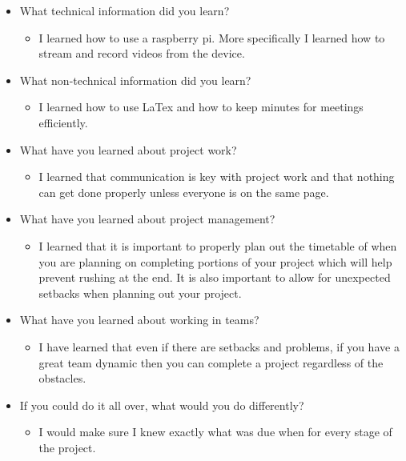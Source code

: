 \documentclass[onecolumn, draftclsnofoot,10pt, compsoc]{IEEEtran}
\begin{document}
    \begin{itemize}
        \item What technical information did you learn?
        \begin{itemize}
            \item I learned how to use a raspberry pi. 
            More specifically I learned how to stream and record videos from the device.
        \end{itemize}
        \item What non-technical information did you learn?
        \begin{itemize}
            \item I learned how to use LaTex and how to keep minutes for meetings efficiently.
        \end{itemize}
        \item What have you learned about project work?
        \begin{itemize}
            \item I learned that communication is key with project work and that nothing can get done properly unless everyone is on the same page.
        \end{itemize}
        \item What have you learned about project management?
        \begin{itemize}
            \item I learned that it is important to properly plan out the timetable of when you are planning on completing portions of your project which will help prevent rushing at the end. 
            It is also important to allow for unexpected setbacks when planning out your project.
        \end{itemize}
        \item What have you learned about working in teams?
        \begin{itemize}
            \item I have learned that even if there are setbacks and problems, if you have a great team dynamic then you can complete a project regardless of the obstacles. 
        \end{itemize}
        \item If you could do it all over, what would you do differently?
        \begin{itemize}
            \item I would make sure I knew exactly what was due when for every stage of the project.
        \end{itemize}
    \end{itemize}
    
\end{document}
